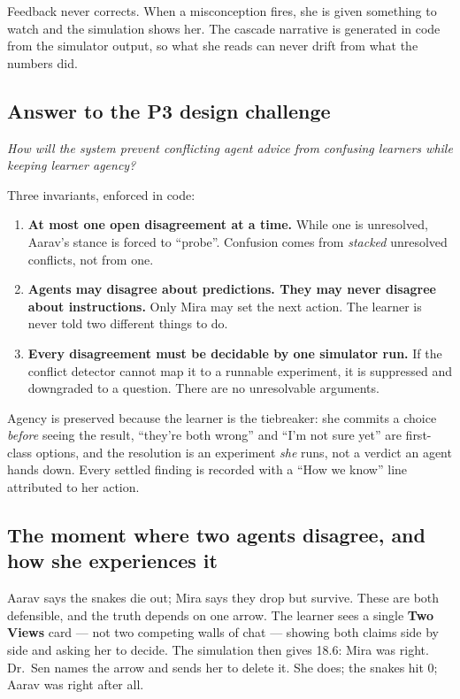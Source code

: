 \documentclass[11pt,a4paper]{article}
\begin{document}
Feedback never corrects. When a misconception fires, she is given something to watch and the
simulation shows her. The cascade narrative is generated in code from the simulator output, so
what she reads can never drift from what the numbers did.

\subsection*{Answer to the P3 design challenge}

\textit{How will the system prevent conflicting agent advice from confusing learners while
keeping learner agency?}

Three invariants, enforced in code:

\begin{enumerate}[leftmargin=*,itemsep=2pt]
  \item \textbf{At most one open disagreement at a time.} While one is unresolved, Aarav's stance
        is forced to ``probe''. Confusion comes from \emph{stacked} unresolved conflicts, not
        from one.
  \item \textbf{Agents may disagree about predictions. They may never disagree about
        instructions.} Only Mira may set the next action. The learner is never told two different
        things to do.
  \item \textbf{Every disagreement must be decidable by one simulator run.} If the conflict
        detector cannot map it to a runnable experiment, it is suppressed and downgraded to a
        question. There are no unresolvable arguments.
\end{enumerate}

Agency is preserved because the learner is the tiebreaker: she commits a choice \emph{before}
seeing the result, ``they're both wrong'' and ``I'm not sure yet'' are first-class options, and
the resolution is an experiment \emph{she} runs, not a verdict an agent hands down. Every
settled finding is recorded with a ``How we know'' line attributed to her action.

\subsection*{The moment where two agents disagree, and how she experiences it}

Aarav says the snakes die out; Mira says they drop but survive. These are both defensible, and
the truth depends on one arrow. The learner sees a single \textbf{Two Views} card --- not two
competing walls of chat --- showing both claims side by side and asking her to decide. The
simulation then gives 18.6: Mira was right. Dr.\ Sen names the arrow and sends her to delete it.
She does; the snakes hit 0; Aarav was right after all.
\end{document}
